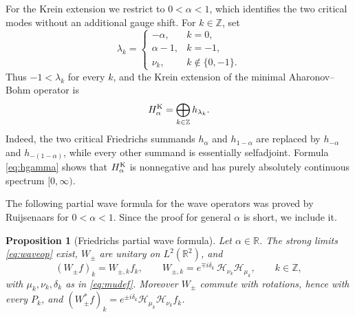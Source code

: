 \documentclass[11pt,a4paper,reqno,backref=page]{amsart}
\newcommand{\R}{\mathbb R}
\newcommand{\Z}{\mathbb Z}
\newcommand{\HH}{\mathcal H}                 %
\numberwithin{equation}{section}
\newtheorem{proposition}[theorem]{Proposition}
\theoremstyle{definition}
\theoremstyle{remark}
\begin{document}
For the Krein extension we restrict to $0<\alpha<1$, which
identifies the two critical modes without an additional gauge
shift. For $k\in\Z$, set
\begin{equation}\label{eq:Krein-orders}
  \lambda_k=
  \begin{cases}
    -\alpha,&k=0,\\
    \alpha-1,&k=-1,\\
    \nu_k,&k\notin\{0,-1\}.
  \end{cases}
\end{equation}
Thus $-1<\lambda_k$ for every $k$, and the Krein extension of
the minimal Aharonov--Bohm operator is
\begin{equation}\label{eq:Krein-def}
  H_\alpha^{\rm K}=\bigoplus_{k\in\Z}h_{\lambda_k}.
\end{equation}
Indeed, the two critical Friedrichs summands $h_\alpha$ and
$h_{1-\alpha}$ are replaced by $h_{-\alpha}$ and
$h_{-(1-\alpha)}$, while every other summand is essentially
selfadjoint. Formula \eqref{eq:hgamma} shows that
$H_\alpha^{\rm K}$ is nonnegative and has purely absolutely
continuous spectrum $[0,\infty)$.

The following partial wave formula for the wave operators was
proved by Ruijsenaars \cite[Theorem~A1]{Ruijsenaars1983} for
$0<\alpha<1$. Since the proof for general $\alpha$ is short, we
include it.

\begin{proposition}[Friedrichs partial wave formula]
\label{prop:partial-wave}
Let $\alpha\in\R$. The strong limits \eqref{eq:waveop} exist,
$W_\pm$ are unitary on $L^2(\R^2)$, and
\begin{equation}\label{eq:partial-wave}
  (W_\pm f)_k=W_{\pm,k}f_k,\qquad
  W_{\pm,k}=e^{\mp i\delta_k}\,\HH_{\nu_k}\HH_{\mu_k},\qquad
  k\in\Z,
\end{equation}
with $\mu_k,\nu_k,\delta_k$ as in \eqref{eq:mudef}. Moreover
$W_\pm$ commute with rotations, hence with every $P_k$, and
$(W_\pm^*f)_k=e^{\pm i\delta_k}\HH_{\mu_k}\HH_{\nu_k}f_k$.
\end{proposition}
\end{document}
